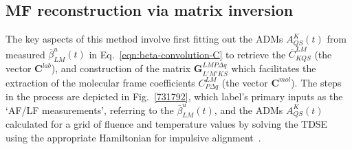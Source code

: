 \documentclass[10pt]{article}
\begin{document}

\subsection{MF reconstruction via matrix inversion\label{sec:Matrix-inversion-example}}

The key aspects of this method involve first fitting out the ADMs $A^K_{QS}(t)$ from measured $\bar{\beta}^u_{LM}(t)$ in Eq.~\ref{eqn:beta-convolution-C} to retrieve the $\bar{C}^{LM}_{KQS}$ (the vector $\mathbf{C}^{lab}$), and construction of the matrix $\mathbf{{G}}^{LMP\Delta q }_{L'M'KS}$ which facilitates the extraction of the molecular frame coefficients $C^{LM}_{P\Delta q}$ (the vector $\mathbf{C}^{mol}$). The steps in the process are depicted in Fig.~\ref{731792}, which label's primary inputs as the `AF/LF measurements', referring to the $\bar{\beta}^u_{LM}(t)$, and the ADMs $A^K_{QS}(t)$ calculated for a grid of fluence and temperature values by solving the TDSE using the appropriate Hamiltonian for impulsive alignment~\cite{hasegawa2015NonadiabaticMolecularAlignment, koch2019QuantumControlMolecular}. 
\end{document}
